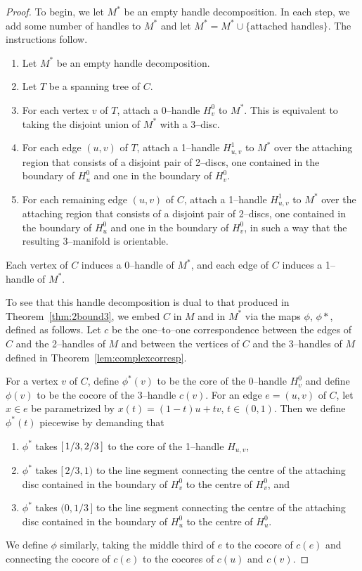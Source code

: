 \begin{proof}
	To begin, we let $M^*$ be an empty handle decomposition.
	In each step, we add some number of handles to $M^*$ and let $M^*=M^*\cup\{\textrm{attached handles}\}$.
	The instructions follow.
	\begin{enumerate}
		\item
			Let $M^*$ be an empty handle decomposition.
		
		\item
			Let $T$ be a spanning tree of $C$.
						
		\item
			For each vertex $v$ of $T$, attach a 0--handle $H_v^0$ to $M^*$.
			This is equivalent to taking the disjoint union of $M^*$ with a 3--disc.
						
		\item
			For each edge $(u,v)$ of $T$, attach a 1--handle $H_{u,v}^1$ to $M^*$ over the attaching region that consists of a disjoint pair of 2--discs, one contained in the boundary of $H_u^0$ and one in the boundary of $H_v^0$.
			
		\item
			For each remaining edge $(u,v)$ of $C$, attach a 1--handle $H_{u,v}^1$ to $M^*$ over the attaching region that consists of a disjoint pair of 2--discs, one contained in the boundary of $H_u^0$ and one in the boundary of $H_v^0$, in such a way that the resulting 3--manifold is orientable.
	\end{enumerate}
	Each vertex of $C$ induces a 0--handle of $M^*$, and each edge of $C$ induces a 1--handle of $M^*$.

	To see that this handle decomposition is dual to that produced in Theorem~\ref{thm:2bound3}, we embed $C$ in $M$ and in $M^*$ via the maps $\phi$, $\phi*$, defined as follows.
	Let $c$ be the one--to--one correspondence between the edges of $C$ and the 2--handles of $M$ and between the vertices of $C$ and the 3--handles of $M$ defined in Theorem~\ref{lem:complexcorresp}.
	
	For a vertex $v$ of $C$, define $\phi^*(v)$ to be the core of the 0--handle $H_v^0$ and define $\phi(v)$ to be the cocore of the 3--handle $c(v)$.
	For an edge $e=(u,v)$ of $C$, let $x\in e$ be parametrized by $x(t)=(1-t)u+tv$, $t\in(0,1)$.
	Then we define $\phi^*(t)$ piecewise by demanding that
	\begin{enumerate}
		\item
			$\phi^*$ takes $[\,{1/3,2/3}\,]$ to the core of the 1--handle $H_{u,v}$,
		\item
			$\phi^*$ takes $[\,2/3,1)$ to the line segment connecting the centre of the attaching disc contained in the boundary of  $H_v^0$ to the centre of $H_v^0$, and
		\item
			$\phi^*$ takes $(0,1/3\,]$ to the line segment connecting the centre of the attaching disc contained in the boundary of $H_u^0$ to the centre of $H_u^0$.
	\end{enumerate}
	We define $\phi$ similarly, taking the middle third of $e$ to the cocore of $c(e)$ and connecting the cocore of $c(e)$ to the cocores of $c(u)$ and $c(v)$.
	

\end{proof}
